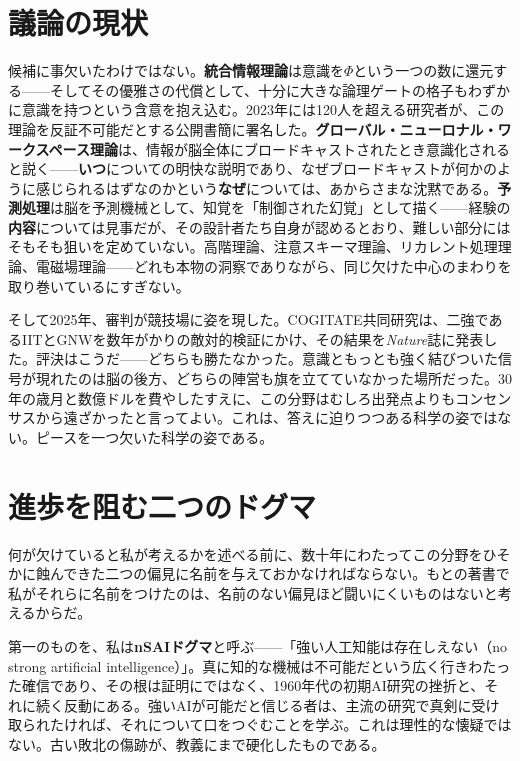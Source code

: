 \documentclass[11pt, twoside, openright]{book}
\begin{document}
\section*{議論の現状}

候補に事欠いたわけではない。\textbf{統合情報理論}は意識を$\Phi$という一つの数に還元する------そしてその優雅さの代償として、十分に大きな論理ゲートの格子もわずかに意識を持つという含意を抱え込む。2023年には120人を超える研究者が、この理論を反証不可能だとする公開書簡に署名した。\textbf{グローバル・ニューロナル・ワークスペース理論}は、情報が脳全体にブロードキャストされたとき意識化されると説く------\textbf{いつ}についての明快な説明であり、なぜブロードキャストが何かのように感じられるはずなのかという\textbf{なぜ}については、あからさまな沈黙である。\textbf{予測処理}は脳を予測機械として、知覚を「制御された幻覚」として描く------経験の\textbf{内容}については見事だが、その設計者たち自身が認めるとおり、難しい部分にはそもそも狙いを定めていない。高階理論、注意スキーマ理論、リカレント処理理論、電磁場理論------どれも本物の洞察でありながら、同じ欠けた中心のまわりを取り巻いているにすぎない。

そして2025年、審判が競技場に姿を現した。COGITATE共同研究は、二強であるIITとGNWを数年がかりの敵対的検証にかけ、その結果を\textit{Nature}誌に発表した。評決はこうだ------どちらも勝たなかった。意識ともっとも強く結びついた信号が現れたのは脳の後方、どちらの陣営も旗を立てていなかった場所だった。30年の歳月と数億ドルを費やしたすえに、この分野はむしろ出発点よりもコンセンサスから遠ざかったと言ってよい。これは、答えに迫りつつある科学の姿ではない。ピースを一つ欠いた科学の姿である。

\section*{進歩を阻む二つのドグマ}

何が欠けていると私が考えるかを述べる前に、数十年にわたってこの分野をひそかに蝕んできた二つの偏見に名前を与えておかなければならない。もとの著書で私がそれらに名前をつけたのは、名前のない偏見ほど闘いにくいものはないと考えるからだ。

第一のものを、私は\textbf{nSAIドグマ}と呼ぶ------「強い人工知能は存在しえない（no strong artificial intelligence）」。真に知的な機械は不可能だという広く行きわたった確信であり、その根は証明にではなく、1960年代の初期AI研究の挫折と、それに続く反動にある。強いAIが可能だと信じる者は、主流の研究で真剣に受け取られたければ、それについて口をつぐむことを学ぶ。これは理性的な懐疑ではない。古い敗北の傷跡が、教義にまで硬化したものである。
\end{document}
